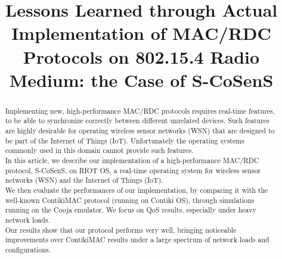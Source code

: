 \documentclass[conference]{IEEEtran}
\begin{document}


\title{Lessons Learned through Actual Implementation of MAC/RDC Protocols
       on 802.15.4 Radio Medium: the Case of S-CoSenS}


\author{
}






\maketitle

\begin{abstract}
Implementing new, high-performance MAC/RDC protocols requires
real-time features, to be able to synchronize correctly between different
unrelated devices. Such features are highly desirable for operating wireless
sensor networks (WSN) that are designed to be part of the Internet of Things
(IoT). Unfortunately the operating systems commonly used in this domain
cannot provide such features.\\
In this article, we describe our implementation of a high-performance MAC/RDC
protocol, S-CoSenS, on RIOT OS, a real-time operating system for wireless
sensor networks (WSN) and the Internet of Things (IoT).\\
We then evaluate the performances of our implementation, by comparing it with
the well-known ContikiMAC protocol (running on Contiki OS), through
simulations running on the Cooja emulator. We focus on QoS results,
especially under heavy network loads.\\
Our results show that our protocol performs very well, bringing noticeable
improvements over ContikiMAC results under a large spectrum of network loads
and configurations.
\end{abstract}
\end{document}
